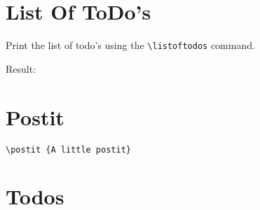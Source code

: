 \documentclass[a4paper,12pt]{article}
\begin{document}
\section{List Of ToDo's}

Print the list of todo's using the \texttt{\textbackslash listoftodos} command. 

Result:

\listoftodos

\newpage

\section{Postit}



\begin{verbatim}
\postit {A little postit}
\end{verbatim}

\section{Todos}
\end{document}
